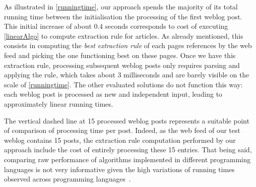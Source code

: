 \begin{figure*}[!hbt]
\centering
\label{runningtime}

\end{figure*}

As illustrated in \autoref{runningtime}, our approach spends the majority 
of its total running time between the initialisation the processing 
of the first weblog post. This initial increase of about 0.4 seconds 
corresponds to cost of executing \autoref{linearAlgo} to compute 
extraction rule for articles. As already mentioned, this consists 
in computing the \emph{best extraction rule} of each pages references 
by the web feed and picking the one functioning best on these pages. 
Once we have this extraction rule, processing subsequent weblog posts only 
requires parsing and applying the rule, which takes about 3 milliseconds 
and are barely visible on the scale of \autoref{runningtime}. The other 
evaluated solutions do not function this way: each weblog post is processed 
as new and independent input, leading to approximately linear running 
times.

The vertical dashed line at 15 processed weblog posts represents a suitable 
point of comparison of processing time per post. Indeed, as the 
web feed of our test weblog contains 15 posts, the extraction rule 
computation performed by our approach include the cost of entirely 
processing these 15 entries. That being said, comparing raw performance 
of algorithms implemented in different programming languages is not very 
informative given the high variations of running times observed across 
programming languages~\cite{hundt2011}.

